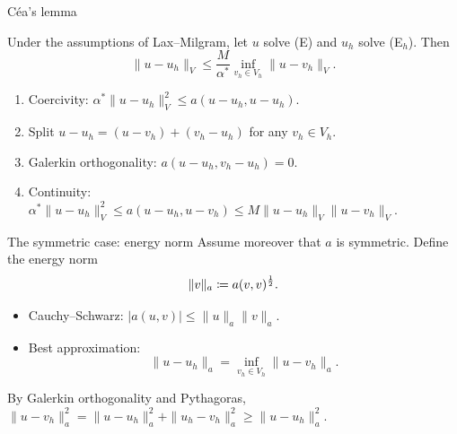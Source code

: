 \begin{frame}{Céa's lemma}
    \begin{theorem}
        Under the assumptions of Lax--Milgram, let $u$ solve (E) and $u_h$ solve (E$_h$). Then
        \[
            \|u - u_h\|_V \le \frac{M}{\alpha^*} \inf_{v_h \in V_h} \|u - v_h\|_V .
        \]
    \end{theorem}
    \begin{proofsteps}
        \begin{enumerate}
            \item Coercivity: $\alpha^* \|u - u_h\|_V^2 \le a(u-u_h, u-u_h)$.
            \item Split $u - u_h = (u - v_h) + (v_h - u_h)$ for any $v_h \in V_h$.
            \item Galerkin orthogonality: $a(u - u_h, v_h - u_h) = 0$.
            \item Continuity: $\alpha^* \|u - u_h\|_V^2 \le a(u - u_h, u - v_h) \le M \|u - u_h\|_V \|u - v_h\|_V$.
        \end{enumerate}
    \end{proofsteps}
\end{frame}

\begin{frame}{The symmetric case: energy norm}
    Assume moreover that $a$ is symmetric. Define the \alert{energy norm}
    \[
        \|v\|_a \coloneqq a(v,v)^{\frac 1 2}.
    \]
    \begin{corollary}[Exercise 1.7]
        \begin{itemize}
            \item Cauchy--Schwarz: $|a(u,v)| \le \|u\|_a \|v\|_a$.
            \item Best approximation:
                  \[
                      \|u - u_h\|_a = \inf_{v_h \in V_h} \|u - v_h\|_a .
                  \]
        \end{itemize}
    \end{corollary}
    \begin{proofsteps}
        By Galerkin orthogonality and Pythagoras,
        $\|u - v_h\|_a^2 = \|u - u_h\|_a^2 + \|u_h - v_h\|_a^2 \ge \|u - u_h\|_a^2$.
    \end{proofsteps}
\end{frame}

